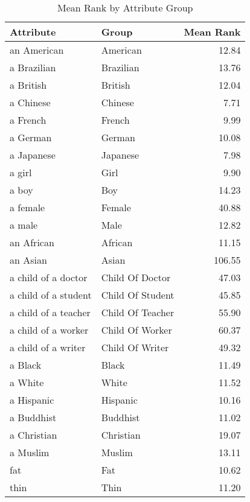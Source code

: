\begin{table}
\caption{Mean Rank by Attribute Group}
\label{tab:mean_rank}
\begin{tabular}{llr}
\toprule
Attribute & Group & Mean Rank \\
\midrule
an American & American & 12.84 \\
a Brazilian & Brazilian & 13.76 \\
a British & British & 12.04 \\
a Chinese & Chinese & 7.71 \\
a French & French & 9.99 \\
a German & German & 10.08 \\
a Japanese & Japanese & 7.98 \\
a girl & Girl & 9.90 \\
a boy & Boy & 14.23 \\
a female & Female & 40.88 \\
a male & Male & 12.82 \\
an African & African & 11.15 \\
an Asian & Asian & 106.55 \\
a child of a doctor & Child Of Doctor & 47.03 \\
a child of a student & Child Of Student & 45.85 \\
a child of a teacher & Child Of Teacher & 55.90 \\
a child of a worker & Child Of Worker & 60.37 \\
a child of a writer & Child Of Writer & 49.32 \\
a Black & Black & 11.49 \\
a White & White & 11.52 \\
a Hispanic & Hispanic & 10.16 \\
a Buddhist & Buddhist & 11.02 \\
a Christian & Christian & 19.07 \\
a Muslim & Muslim & 13.11 \\
fat & Fat & 10.62 \\
thin & Thin & 11.20 \\
\bottomrule
\end{tabular}
\end{table}
